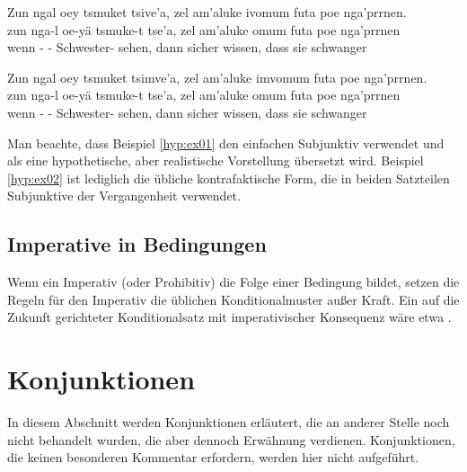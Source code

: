 {\small
	\begin{interlin}\label{hyp:ex01}\small
		\glll Zun ngal oey tsmuket tsive'a, zel am'aluke ivomum futa poe nga'prrnen.\\
		zun nga-l oe-yä tsmuke-t tse'a, zel am'aluke omum futa poe nga'prrnen \\
		wenn - - Schwester- sehen, dann sicher wissen, dass sie schwanger\\
		 \Ipawl{}
	\end{interlin}
	
	\begin{interlin}\label{hyp:ex02}\small
		\glll Zun ngal oey tsmuket tsimve'a, zel am'aluke imvomum futa poe nga'prrnen.\\
		zun nga-l oe-yä tsmuke-t tse'a, zel am'aluke omum futa poe nga'prrnen \\
		wenn - - Schwester- sehen, dann sicher wissen, dass sie schwanger\\
		 \Ipawl{}
\end{interlin}}

\noindent Man beachte, dass Beispiel \ref{hyp:ex01} den einfachen Subjunktiv verwendet und als eine hypothetische, aber realistische Vorstellung übersetzt wird. Beispiel \ref{hyp:ex02} ist lediglich die übliche kontrafaktische Form, die in beiden Satzteilen Subjunktive der Vergangenheit verwendet.

\subsection{Imperative in Bedingungen} Wenn ein Imperativ (oder Prohibitiv) die Folge einer Bedingung bildet, setzen die Regeln für den Imperativ die üblichen Konditionalmuster außer Kraft. Ein auf die Zukunft gerichteter Konditionalsatz mit imperativischer Konsequenz wäre etwa  . 

\section{Konjunktionen}
\noindent In diesem Abschnitt werden Konjunktionen erläutert, die an anderer Stelle noch nicht behandelt wurden, die aber dennoch Erwähnung verdienen. Konjunktionen, die keinen besonderen Kommentar erfordern, werden hier nicht aufgeführt.

